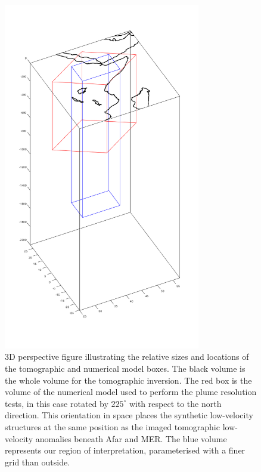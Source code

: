 \documentclass[a4paper,10pt,twocolumn]{paper}
\begin{document}
\begin{figure}
\centering
\includegraphics[width=8.6cm]{../figures-working/fig06.png}
\caption{3D perspective figure illustrating the relative sizes and locations of the tomographic and numerical model boxes. The black volume is the whole volume for the tomographic inversion. The red box is the volume of the numerical model used to perform the plume resolution tests, in this case rotated by $225^{\circ}$ with respect to the north direction. This orientation in space places the synthetic low-velocity structures at the same position as the imaged tomographic low-velocity anomalies beneath Afar and MER. The blue volume represents our region of interpretation, parameterised with a finer grid than outside.}
\label{fg:6}
\end{figure}
\end{document}
